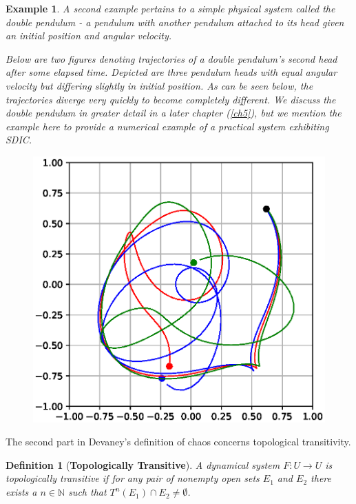 \documentclass[a4paper,12pt,twoside]{report}
\newtheorem{Definition}{Definition}[]
\newtheorem{Example}{Example}[]
\begin{document}
\begin{Example} \rm
  A second example pertains to a simple physical system called the double pendulum - a pendulum with another pendulum attached to its head given an initial position and angular velocity.  

  Below are two figures denoting trajectories of a double pendulum's second head after some elapsed time. Depicted are three pendulum heads with equal angular velocity but differing slightly in initial position. As can be seen below, the trajectories diverge very quickly to become completely different. We discuss the double pendulum in greater detail in a later chapter (\ref{ch5}), but we mention the example here to provide a numerical example of a practical system exhibiting SDIC.

\begin{figure}[ht]
  \centering
\includegraphics[scale=0.8]{_dp_sdic.eps}
    \label{fig:dp_sdic}
  \end{figure}

\end{Example}


The second part in Devaney's definition of chaos concerns topological transitivity.

\begin{Definition}
  [\bf {Topologically Transitive}]\label{Dfn_TopolTrans}\rm
	A dynamical system $F: U \to U$ is topologically transitive if for any pair of nonempty open sets $E_1$ and $E_2$ there exists a $n\in\mathbb{N}$ such that $T^n(E_1) \cap E_2 \not= \emptyset$. 
\end{Definition}
\end{document}

